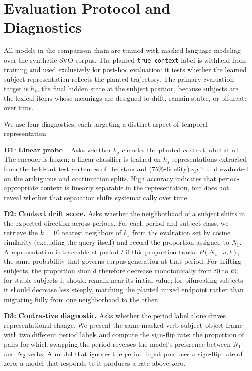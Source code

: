 \documentclass[runningheads]{llncs}
\begin{document}
\section{Evaluation Protocol and Diagnostics}
All models in the comparison chain are trained with masked language modeling
over the synthetic SVO corpus. The planted \texttt{true\_context} label is
withheld from training and used exclusively for post-hoc evaluation: it tests
whether the learned subject representation reflects the planted trajectory. The primary evaluation target is \(h_s\), the final hidden state
at the subject position, because subjects are the lexical items whose meanings
are designed to drift, remain stable, or bifurcate over time.

We use four diagnostics, each targeting a distinct aspect of temporal
representation.

\textbf{D1: Linear probe~\cite{conneau2018probing}.} Asks whether \(h_s\)
encodes the planted context label at all. The encoder is frozen; a linear
classifier is trained on \(h_s\) representations extracted from the held-out
test sentences of the standard (75\%-fidelity) split and evaluated on the
ambiguous and continuation splits. High accuracy indicates that
period-appropriate context is linearly separable in the representation, but
does not reveal whether that separation shifts systematically over time.

\textbf{D2: Context drift score.} Asks whether the neighborhood of a subject
shifts in the expected direction across periods. For each period and subject
class, we retrieve the \(k=10\) nearest neighbors of \(h_s\) from the evaluation set
by cosine similarity (excluding the query itself) and record the proportion
assigned to $N_1$. A representation is traceable at period \(t\) if this proportion tracks
\(P(N_1 \mid s, t)\), the same probability that governs corpus generation at
that period. For drifting subjects, the proportion should therefore decrease
monotonically from $t0$ to $t9$; for stable subjects it should remain near its
initial value; for bifurcating subjects it should decrease less steeply, matching
the planted mixed endpoint rather than migrating fully from one neighborhood to
the other.

\textbf{D3: Contrastive diagnostic.} Asks whether the period label alone
drives representational change. We present the same masked-verb subject--object
frame with two different period labels and compute the sign-flip rate: the
proportion of pairs for which swapping the period reverses the model's preference
between $N_1$ and $N_2$ verbs. A model that ignores the period
input produces a sign-flip rate of zero; a model that responds to it produces a
rate above zero.
\end{document}
